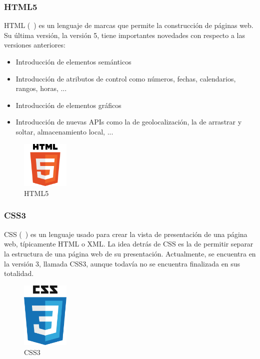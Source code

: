 \subsubsection*{HTML5}

HTML (~\cite{html5}) es un lenguaje de marcas que permite la construcción de páginas web. Su última versión, la versión 5, tiene importantes novedades con respecto a las versiones anteriores:

\begin{itemize}
\item Introducción de elementos semánticos
\item Introducción de atributos de control como números, fechas, calendarios, rangos, horas, ...
\item Introducción de elementos gráficos
\item Introducción de nuevas APIs como la de geolocalización, la de arrastrar y soltar, almacenamiento local, ...
\end{itemize}

\begin{figure}[tbh]
\centering
\label{fig:html5}
\includegraphics[width=0.2\textwidth]{imagenes/html5}
\caption{HTML5}
\end{figure}

\subsubsection*{CSS3}
CSS (~\cite{css3}) es un lenguaje usado para crear la vista de presentación de una página web, típicamente HTML o XML. La idea detrás de CSS es la de permitir separar la estructura de una página web de su presentación. Actualmente, se encuentra en la versión 3, llamada CSS3, aunque todavía no se encuentra finalizada en sus totalidad.

\begin{figure}[tbh]
\centering
\label{fig:css3}
\includegraphics[width=0.2\textwidth]{imagenes/css3}
\caption{CSS3}
\end{figure}

